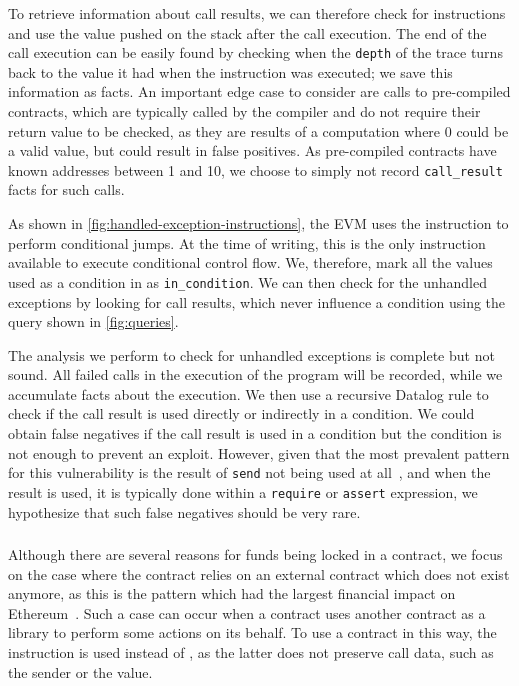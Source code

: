 To retrieve information about call results, we can therefore check for  instructions and use the value pushed on the stack after the call execution. The end of the call execution can be easily found by checking when the \lstinline{depth} of the trace turns back to the value it had when the  instruction was executed; we save this information as  facts.
An important edge case to consider are calls to pre-compiled contracts, which are typically called by the compiler and do not require their return value to be checked, as they are results of a computation where $0$ could be a valid value, but could result in false positives.
As pre-compiled contracts have known addresses between 1 and 10, we choose to simply not record \lstinline{call_result} facts for such calls.

As shown in \autoref{fig:handled-exception-instructions}, the EVM uses the  instruction to perform conditional jumps. At the time of writing, this is the only instruction available to execute conditional control flow. We, therefore, mark all the values used as a condition in  as \lstinline{in_condition}. We can then check for the unhandled exceptions by looking for call results, which never influence a condition using the query shown in \autoref{fig:queries}.

\correctness The analysis we perform to check for unhandled exceptions is complete but not sound.
All failed calls in the execution of the program will be recorded, while we accumulate facts about the execution.
We then use a recursive Datalog rule to check if the call result is used directly or indirectly in a condition.
We could obtain false negatives if the call result is used in a condition but the condition is not enough to prevent an exploit.
However, given that the most prevalent pattern for this vulnerability is the result of \lstinline{send} not being used at all~\cite{Tsankov2018}, and when the result is used, it is typically done within a \lstinline{require} or \lstinline{assert} expression, we hypothesize that such false negatives should be very rare.

\subsubsection{\lockedether}
Although there are several reasons for funds being locked in a contract, we focus on the case where the contract relies on an external contract which does not exist anymore, as this is the pattern which had the largest financial impact on Ethereum~\cite{Breidenbach}. Such a case can occur when a contract uses another contract as a library to perform some actions on its behalf. To use a contract in this way, the  instruction is used instead of , as the latter does not preserve call data, such as the sender or the value.

